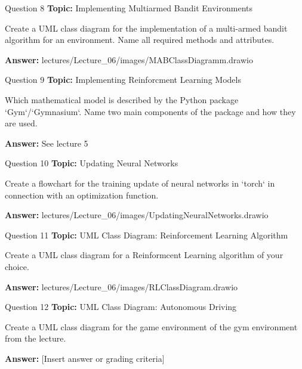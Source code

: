 \begin{frame}{Question 8}
    \textbf{Topic:} Implementing Multiarmed Bandit Environments
    \vspace{10pt}

    Create a UML class diagram for the implementation of a multi-armed bandit algorithm for an environment. Name all required methods and attributes. 
    \vspace{20pt}

    \textbf{Answer:} lectures/Lecture\_06/images/MABClassDiagramm.drawio
\end{frame}

\begin{frame}{Question 9}
    \textbf{Topic:} Implementing Reinforcment Learning Models
    \vspace{10pt}

    Which mathematical model is described by the Python package `Gym`/`Gymnasium`. Name two main components of the package and how they are used. 
    \vspace{20pt}

    \textbf{Answer:} See lecture 5
\end{frame}

\begin{frame}{Question 10}
    \textbf{Topic:} Updating Neural Networks
    \vspace{10pt}

    Create a flowchart for the training update of neural networks in `torch` in connection with an optimization function.
    \vspace{20pt}

    \textbf{Answer:} lectures/Lecture\_06/images/UpdatingNeuralNetworks.drawio
\end{frame}

\begin{frame}{Question 11}
    \textbf{Topic:} UML Class Diagram: Reinforcement Learning Algorithm
    \vspace{10pt}

    Create a UML class diagram for a Reinformcent Learning algorithm of your choice. 
    \vspace{20pt}

    \textbf{Answer:} lectures/Lecture\_06/images/RLClassDiagram.drawio
\end{frame}

\begin{frame}{Question 12}
    \textbf{Topic:} UML Class Diagram: Autonomous Driving
    \vspace{10pt}

    Create a UML class diagram for the game environment of the gym environment from the lecture.
    \vspace{20pt}

    \textbf{Answer:} [Insert answer or grading criteria]
\end{frame}

